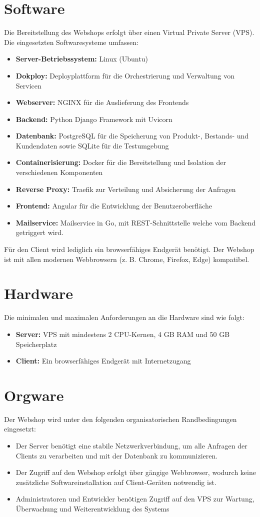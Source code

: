 \documentclass[%
	12pt,
	a4paper,
	oneside,
	parskip=full
]{scrbook}
\begin{document}
\section{Software}
Die Bereitstellung des Webshops erfolgt über einen Virtual Private Server (VPS). Die eingesetzten Softwaresysteme umfassen:
\begin{itemize}
	\item \textbf{Server-Betriebssystem:} Linux (Ubuntu)
	\item \textbf{Dokploy:} Deployplattform für die Orchestrierung und Verwaltung von Servicen
	\item \textbf{Webserver:} NGINX für die Auslieferung des Frontends
	\item \textbf{Backend:} Python Django Framework mit Uvicorn
	\item \textbf{Datenbank:} PostgreSQL für die Speicherung von Produkt-, Bestands- und Kundendaten sowie SQLite für die Testumgebung
	\item \textbf{Containerisierung:} Docker für die Bereitstellung und Isolation der verschiedenen Komponenten
	\item \textbf{Reverse Proxy:} Traefik zur Verteilung und Absicherung der Anfragen
	\item \textbf{Frontend:} Angular für die Entwicklung der Benutzeroberfläche
	\item \textbf{Mailservice:} Mailservice in Go, mit REST-Schnittstelle welche vom Backend getriggert wird.
	\end{itemize}
Für den Client wird lediglich ein browserfähiges Endgerät benötigt. Der Webshop ist mit allen modernen Webbrowsern (z. B. Chrome, Firefox, Edge) kompatibel.

\section{Hardware}
Die minimalen und maximalen Anforderungen an die Hardware sind wie folgt:
\begin{itemize}
	\item \textbf{Server:} VPS mit mindestens 2 CPU-Kernen, 4 GB RAM und 50 GB Speicherplatz
	\item \textbf{Client:} Ein browserfähiges Endgerät mit Internetzugang
\end{itemize}

\section{Orgware}
Der Webshop wird unter den folgenden organisatorischen Randbedingungen eingesetzt:
\begin{itemize}
	\item Der Server benötigt eine stabile Netzwerkverbindung, um alle Anfragen der Clients zu verarbeiten und mit der Datenbank zu kommunizieren.
	\item Der Zugriff auf den Webshop erfolgt über gängige Webbrowser, wodurch keine zusätzliche Softwareinstallation auf Client-Geräten notwendig ist.
	\item Administratoren und Entwickler benötigen Zugriff auf den VPS zur Wartung, Überwachung und Weiterentwicklung des Systems
\end{itemize}
\end{document}
